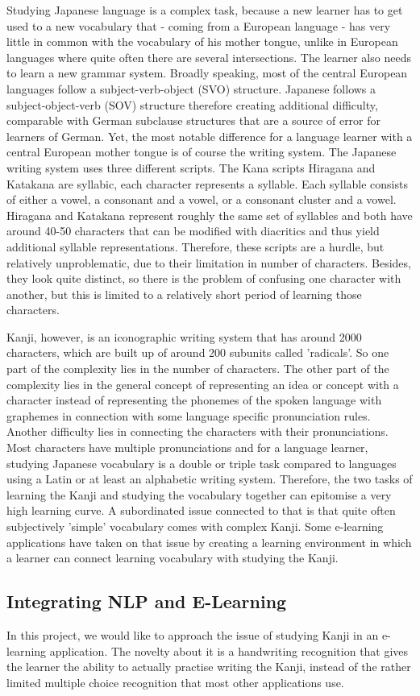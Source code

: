 Studying Japanese language is a complex task, because a new learner has to get used to a new vocabulary that - coming from a European language - has very little in common with the vocabulary of his mother tongue, unlike in European languages where quite often there are several intersections. The learner also needs to learn a new grammar system. Broadly speaking, most of the central European languages follow a subject-verb-object (SVO) structure. Japanese follows a subject-object-verb (SOV) structure therefore creating additional difficulty, comparable with German subclause structures that are a source of error for learners of German. 
Yet, the most notable difference for a language learner with a central European mother tongue is of course the writing system. The Japanese writing system uses three different scripts. The Kana scripts Hiragana and Katakana are syllabic, each character represents a syllable. Each syllable consists of either a vowel, a consonant and a vowel, or a consonant cluster and a vowel. Hiragana and Katakana represent roughly the same set of syllables and both have around 40-50 characters that can be modified with diacritics and thus yield additional syllable representations. Therefore, these scripts are a hurdle, but relatively unproblematic, due to their limitation in number of characters. Besides, they look quite distinct, so there is the problem of confusing one character with another, but this is limited to a relatively short period of learning those characters.

Kanji, however, is an iconographic writing system that has around 2000 characters, which are built up of around 200 subunits called 'radicals'. So one part of the complexity lies in the number of characters. The other part of the complexity lies in the general concept of representing an idea or concept with a character instead of representing the phonemes of the spoken language with graphemes in connection with some language specific pronunciation rules. Another difficulty lies in connecting the characters with their pronunciations. Most characters have multiple pronunciations and for a language learner, studying Japanese vocabulary is a double or triple task compared to languages using a Latin or at least an alphabetic writing system. Therefore, the two tasks of learning the Kanji and studying the vocabulary together can epitomise a very high learning curve. A subordinated issue connected to that is that quite often subjectively 'simple' vocabulary comes with complex Kanji.
Some e-learning applications have taken on that issue by creating a learning environment in which a learner can connect learning vocabulary with studying the Kanji.


\subsection{Integrating NLP and E-Learning}
In this project, we would like to approach the issue of studying Kanji in an e-learning application. The novelty about it is a handwriting recognition that gives the learner the ability to actually practise writing the Kanji, instead of the rather limited multiple choice recognition that most other applications use.

